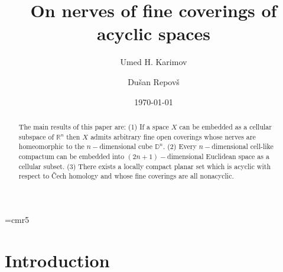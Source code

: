 
\usepackage{amssymb}
\usepackage{amsmath}
\usepackage{amsfonts}
\usepackage{pstricks}
\usepackage{pst-node}
\usepackage{graphicx}
\theoremstyle{plain}
\newtheorem{thm}{Theorem}[section]
\newtheorem{prop}[thm]{Proposition}
\newtheorem{lmm}[thm]{Lemma}
\newtheorem{cor}[thm]{Corollary}
\newtheorem{dfn}[thm]{Definition}
\newtheorem{rmk}[thm]{Remark}
\newtheorem{qws}[thm]{Question}
\newtheorem{ass}[thm]{Assertion}
\newtheorem{prb}[thm]{Problem}
\theoremstyle{remark}
\font\fiverm=cmr5



\bigskip

\title[On nerves of fine coverings of acyclic spaces]{On nerves of fine coverings of acyclic spaces}

\bigskip

\bigskip

\author[U.~H.~Karimov]{Umed H. Karimov}
\address{Institute of Mathematics, 
Academy of Sciences of Tajikistan, 
Ul. Ainy $299^A$, 
734063 Dushanbe, 
Tajikistan}

\author[D.~Repov\v{s}]{Du\v san Repov\v s } \address{Faculty of Education 
and 
Faculty of Mathematics and Physics,
University of Ljubljana, 
Kardeljeva pl. 16, 
1000 Ljubljana,
Slovenia}



\begin{abstract}
The main results of this paper are:
(1) If a space $X$
can be embedded as a
cellular subspace
of $\mathbb{R}^n$ then $X$
admits arbitrary fine open
coverings whose nerves 
are homeomorphic to the $n-$dimensional
cube $\mathbb{D}^n.$
(2) Every $n-$dimensional cell-like compactum can be
embedded  into $(2n+1)-$dimensional Euclidean space
as a cellular subset.
(3)  There exists a locally compact planar 
set which is acyclic with respect to {\v C}ech
homology and whose fine coverings are all  nonacyclic.
\end{abstract}

\date{\today}

\maketitle

\section{Introduction}


